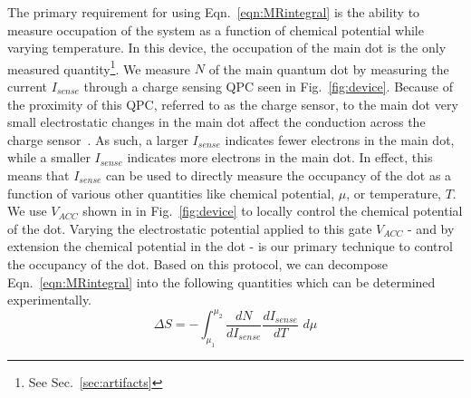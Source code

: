 The primary requirement for using Eqn.~\ref{eqn:MRintegral} is the ability to measure occupation of the system as a function of chemical potential while varying temperature. In this device, the occupation of the main dot is the only measured quantity\footnote{See Sec.~\ref{sec:artifacts}}. We measure $N$ of the main quantum dot by measuring the current $I_{sense}$ through a charge sensing \ac{QPC} seen in Fig.~\ref{fig:device}. Because of the proximity of this \ac{QPC}, referred to as the charge sensor, to the main dot very small electrostatic changes in the main dot affect the conduction across the charge sensor~\cite{spintocharge}. As such, a larger $I_{sense}$ indicates fewer electrons in the main dot, while a smaller $I_{sense}$ indicates more electrons in the main dot. In effect, this means that $I_{sense}$ can be used to directly measure the occupancy of the dot as a function of various other quantities like chemical potential, $\mu$, or temperature, $T$. We use $V_{ACC}$ shown in in Fig.~\ref{fig:device} to locally control the chemical potential of the dot. Varying the electrostatic potential applied to this gate $V_{ACC}$ - and by extension the chemical potential in the dot - is our primary technique to control the occupancy of the dot. Based on this protocol, we can decompose Eqn.~\ref{eqn:MRintegral} into the following quantities which can be determined experimentally.
\begin{equation}
	\label{eqn:eqn2}
	\Delta S = - \int_{\mu_1}^{\mu_2} \frac{dN}{dI_{sense}} \frac{dI_{sense}}{dT} \,\,  d \mu
\end{equation}

